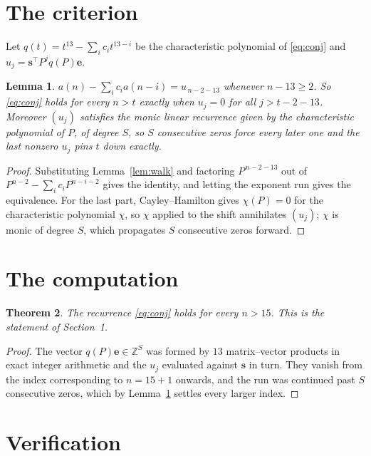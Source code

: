 \documentclass[11pt,a4paper]{article}
\theoremstyle{plain}
\newtheorem{theorem}{Theorem}
\newtheorem{lemma}[theorem]{Lemma}
\theoremstyle{definition}
\begin{document}
\section{The criterion}

Let $q(t)=t^{13}-\sum_i c_i t^{13-i}$ be the characteristic polynomial of
\eqref{eq:conj} and $u_j=\mathbf{s}^{\!\top}P^{j}q(P)\mathbf{e}$.

\begin{lemma}\label{lem:crit}
$a(n)-\sum_i c_i a(n-i)=u_{\,n-2-13}$ whenever $n-13\ge2$. So \eqref{eq:conj}
holds for every $n>t$ exactly when $u_j=0$ for all $j>t-2-13$. Moreover $(u_j)$
satisfies the monic linear recurrence given by the characteristic polynomial of $P$, of
degree $S$, so $S$ consecutive zeros force every later one and the last nonzero $u_j$ pins
$t$ down exactly.
\end{lemma}

\begin{proof}
Substituting Lemma~\ref{lem:walk} and factoring $P^{\,n-2-13}$ out of
$P^{n-2}-\sum_i c_i P^{n-i-2}$ gives the identity, and letting the exponent run gives the
equivalence. For the last part, Cayley--Hamilton gives $\chi(P)=0$ for the characteristic
polynomial $\chi$, so $\chi$ applied to the shift annihilates $(u_j)$; $\chi$ is monic of
degree $S$, which propagates $S$ consecutive zeros forward.
\end{proof}

\section{The computation}

\begin{theorem}
The recurrence \eqref{eq:conj} holds for every $n>15$. This is the statement of
Section~1.
\end{theorem}

\begin{proof}
The vector $q(P)\mathbf{e}\in\mathbb{Z}^{S}$ was formed by $13$ matrix--vector
products in exact integer arithmetic and the $u_j$ evaluated against $\mathbf{s}$ in turn.
They vanish from the index corresponding to $n=15+1$ onwards, and the run was continued
past $S$ consecutive zeros, which by Lemma~\ref{lem:crit} settles every larger index.
\end{proof}

\section{Verification}
\end{document}
